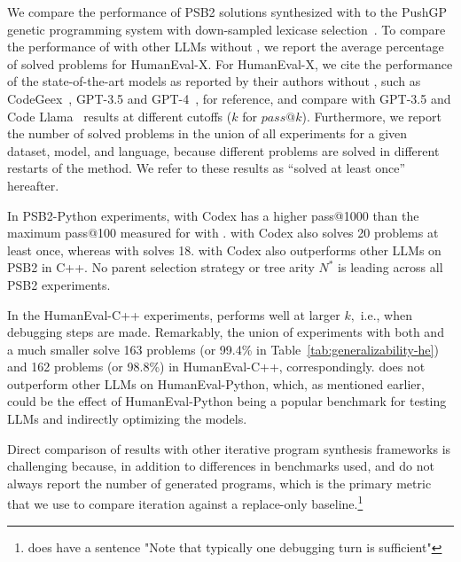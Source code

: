 We compare the performance of PSB2 solutions synthesized with \method{} to the PushGP genetic programming system with down-sampled lexicase selection~\cite{helmuth2022:problemsolving}. 
To compare the performance of \method{} with other LLMs without \method{}, we report the average percentage of solved problems for HumanEval-X. 
For HumanEval-X, we cite the performance of the state-of-the-art models as reported by their authors without \method{}, such as CodeGeex~\cite{zheng2023:codegeex}, GPT-3.5 and GPT-4~\cite{openai2023:gpt4}, for reference, and compare \method{} with GPT-3.5 and Code Llama~\cite{roziere2023:code} results at different cutoffs ($k$ for $pass@k$).
Furthermore, we report the number of solved problems in the union of all experiments for a given dataset, model, and language, because different problems are solved in different restarts of the method. 
We refer to these results as ``solved at least once'' hereafter.

In PSB2-Python experiments, \method{} with Codex has a higher pass@1000 than the maximum pass@100 measured for \method{} with \gpt{}. \method{} with Codex also solves 20 problems at least once, whereas \method{} with \gpt{} solves 18.
\method{} with Codex also outperforms other LLMs on PSB2 in C++.
No parent selection strategy or tree arity $N^*$ is leading across all PSB2 experiments. 

In the HumanEval-C++ experiments, \method{} performs well at larger $k,$ i.e., when debugging steps are made. 
Remarkably, the union of \method{} experiments with both \gpt{} and a much smaller \llama{} solve 163 problems (or 99.4\% in Table~\ref{tab:generalizability-he}) and 162 problems (or 98.8\%) in HumanEval-C++, correspondingly.
\method{} does not outperform other LLMs on HumanEval-Python, which, as mentioned earlier, could be the effect of HumanEval-Python being a popular benchmark for testing LLMs and indirectly optimizing the models.

Direct comparison of \method{} results with other iterative program synthesis frameworks is challenging because, in addition to differences in benchmarks used, \citet{jiang2023:selfevolve} and \cite{chen2023:teaching} do not always report the number of generated programs, which is the primary metric that we use to compare iteration against a replace-only baseline.\footnote{\cite{chen2023:teaching} does have a sentence "Note that typically one debugging turn is sufficient"}


